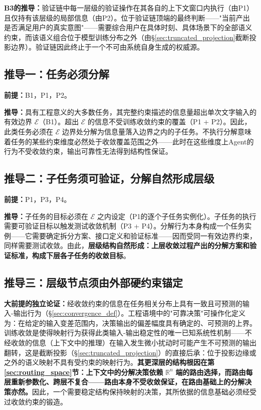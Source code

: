 \documentclass[11pt,a4paper]{article}
\theoremstyle{definition}
\newcommand{\effcap}{\mathcal{E}}
\begin{document}
\textbf{B3的推导：}验证链中每一层级的验证操作在其各自的上下文窗口内执行（由P1）且仅持有该层级的局部信息（由P2）。位于验证链顶端的最终判断——"当前产出是否满足用户的真实意图"——需要综合用户在具体时刻、具体场景下的全部语义约束，而该语义组合位于模型训练分布之外（由\S\ref{sec:truncated_projection}截断投影边界）。验证链因此终止于一个不可由系统自身生成的权威源。

\subsection{推导一：任务必须分解}

\textbf{前提：}B1，P1，P2。

\textbf{推导：}具有工程意义的大多数任务，其完整约束描述的信息量超出单次文字输入的有效边界 $\effcap$（B1）。超出 $\effcap$ 的信息不受训练收敛约束的覆盖（P1 + P2）。因此，此类任务必须在 $\effcap$ 边界处分解为信息量落入边界之内的子任务。不执行分解意味着任务的某些约束维度必然处于收敛覆盖范围之外——此时在这些维度上Agent的行为不受收敛约束，输出可靠性无法得到结构性保证。

\subsection{推导二：子任务须可验证，分解自然形成层级}

\textbf{前提：}P1，P3，P4。

\textbf{推导：}子任务的目标必须在 $\effcap$ 之内设定（P1的逐个子任务实例化）。子任务的执行需要可验证目标以触发测试收敛机制（P3 + P4）。分解行为本身构成一个任务实例——它需要确定拆分方案、接口定义和验证标准——因而受同一有效边界约束，同样需要测试收敛。由此，\textbf{层级结构自然形成：上层收敛过程产出的分解方案和验证标准，构成下层各子任务的收敛目标}。

\subsection{推导三：层级节点须由外部硬约束锚定}

\textbf{大前提的独立论证：}经收敛约束的信息在任务相关分布上具有一致且可预测的输入-输出行为（\S\ref{sec:convergence_def}）。工程语境中的"可靠决策"可操作化定义为：在给定的输入变差范围内，决策输出的偏差幅度具有确定的、可预测的上界。训练收敛是使得映射行为获得此类输入-输出稳定性的唯一已知系统性机制——不经收敛的信息（上下文中的推理）在输入发生微小扰动时可能产生不可预测的输出翻转，这是截断投影（\S\ref{sec:truncated_projection}）的直接后承：位于投影边缘或之外的语义映射不具有受约束的映射行为。\textbf{其更深层的结构根因在第\ref{sec:routing_space}节：上下文中的分解决策依赖} $\mathbb{R}^n$ \textbf{端的路由选择，而路由每层重新参数化、跨层不复合——路由本身不受收敛保证，在路由基础上的分解决策亦然。}因此，一个需要稳定结构保持映射的决策，其所依据的信息基础必须经受过收敛约束的锻造。
\end{document}
